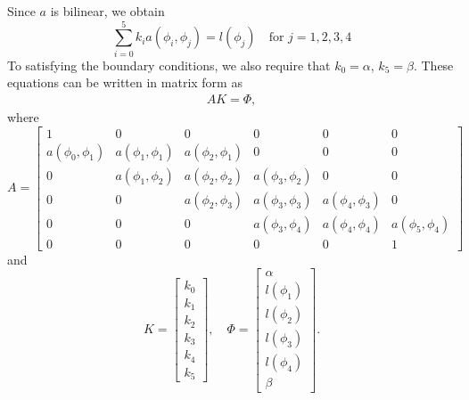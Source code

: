 Since $a$ is bilinear, we obtain 
\[
\sum_{i=0}^5 k_i  a ( \phi_i,\phi_j ) = l(\phi_j) \quad \text{for } j = 1,2,3,4
\]
To satisfying the boundary conditions, we also require that $k_0 = \alpha$, $k_5 = \beta$.
These equations can be written in matrix form as 
\begin{align} AK = \Phi,\label{FE:linear_system}\end{align}
where 
\[
A = \left[\begin{array}{cccccc}1 & 0 & 0 & 0 & 0 & 0 \\a(\phi_0,\phi_1) & a(\phi_1,\phi_1) & a(\phi_2,\phi_1) & 0 & 0 & 0 \\0 & a(\phi_1,\phi_2) & a(\phi_2,\phi_2) & a(\phi_3,\phi_2) & 0 & 0 \\0 & 0 & a(\phi_2,\phi_3) & a(\phi_3,\phi_3) & a(\phi_4,\phi_3) & 0 \\0 & 0 & 0 & a(\phi_3,\phi_4) & a(\phi_4,\phi_4) & a(\phi_5,\phi_4) \\0 & 0 & 0 & 0 & 0 &1\end{array}\right]
\]
and
\[
K = \left[\begin{array}{c}k_0 \\k_1 \\k_2 \\k_3 \\k_4 \\k_5\end{array}\right] , \quad\Phi =  \left[\begin{array}{c}\alpha \\l(\phi_1) \\l(\phi_2) \\l(\phi_3) \\l(\phi_4) \\\beta\end{array}\right] .
\]

